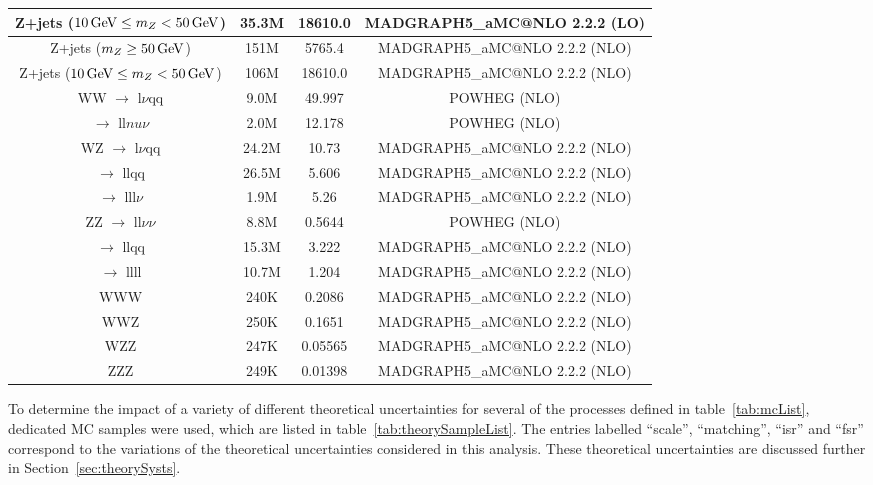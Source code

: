 \begin{table}[htbp]
{\begin{tabular}{cccc}
   Z+jets ($10 \,\text{Ge\hspace{-.08em}V} \leq m_{Z} < 50\,\text{Ge\hspace{-.08em}V}$) & 35.3M & 18610.0 & MADGRAPH5\_aMC@NLO 2.2.2 (LO) \\
   \hline
   Z+jets ($m_{Z} \geq 50\,\text{Ge\hspace{-.08em}V} $) & 151M & 5765.4 & MADGRAPH5\_aMC@NLO 2.2.2 (NLO) \\
   Z+jets ($10 \,\text{Ge\hspace{-.08em}V} \leq m_{Z} < 50\,\text{Ge\hspace{-.08em}V}$) & 106M & 18610.0 & MADGRAPH5\_aMC@NLO 2.2.2 (NLO) \\
   \hline
   WW $\rightarrow$ l$\nu$qq & 9.0M & 49.997  & POWHEG (NLO) \\
      $\rightarrow$ ll$nu\nu$ & 2.0M & 12.178 & POWHEG (NLO) \\
   \hline
   WZ $\rightarrow$ l$\nu$qq & 24.2M & 10.73 & MADGRAPH5\_aMC@NLO 2.2.2 (NLO) \\
      $\rightarrow$ llqq & 26.5M & 5.606 & MADGRAPH5\_aMC@NLO 2.2.2 (NLO) \\
      $\rightarrow$ lll$\nu$ & 1.9M & 5.26 & MADGRAPH5\_aMC@NLO 2.2.2 (NLO) \\
   \hline
   ZZ $\rightarrow$ ll$\nu\nu$ & 8.8M & 0.5644 & POWHEG (NLO) \\
      $\rightarrow$ llqq & 15.3M & 3.222 & MADGRAPH5\_aMC@NLO 2.2.2 (NLO) \\
      $\rightarrow$ llll & 10.7M & 1.204 & MADGRAPH5\_aMC@NLO 2.2.2 (NLO) \\
   \hline
   WWW & 240K & 0.2086 & MADGRAPH5\_aMC@NLO 2.2.2 (NLO) \\
   \hline
   WWZ & 250K & 0.1651 & MADGRAPH5\_aMC@NLO 2.2.2 (NLO) \\
   \hline
   WZZ & 247K & 0.05565 & MADGRAPH5\_aMC@NLO 2.2.2 (NLO) \\
   \hline
   ZZZ & 249K & 0.01398 & MADGRAPH5\_aMC@NLO 2.2.2 (NLO) \\
   \hline
   
 \end{tabular}}
\end{table}

To determine the impact of a variety of different theoretical uncertainties for several of the processes defined in table~\ref{tab:mcList}, dedicated MC samples were used, which are listed in table~\ref{tab:theorySampleList}.
The entries labelled ``scale'', ``matching'', ``isr'' and ``fsr'' correspond to the variations of the theoretical uncertainties considered in this analysis.
These theoretical uncertainties are discussed further in Section~\ref{sec:theorySysts}.

